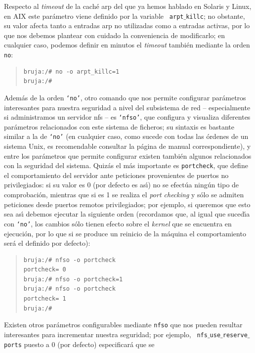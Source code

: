 Respecto al {\it timeout} de la cach\'e {\sc arp} del que ya hemos hablado en
Solaris y Linux, en AIX este par\'ametro viene definido por la variable {\tt
arpt$\_$killc}; no obstante, su valor afecta tanto a entradas {\sc arp} no
utilizadas como a entradas activas, por lo que nos debemos plantear con cuidado
la conveniencia de modificarlo; en cualquier caso, podemos definir en minutos
el {\it timeout} tambi\'en mediante la orden {\tt no}:
\begin{quote}
\begin{verbatim}
bruja:/# no -o arpt_killc=1
bruja:/#
\end{verbatim}
\end{quote}
Adem\'as de la orden {\tt `no'}, otro comando que nos permite configurar 
par\'ametros interesantes para nuestra seguridad a nivel del subsistema de red
-- especialmente si administramos un servidor {\sc nfs} -- es {\tt `nfso'}, que
configura y visualiza diferentes par\'ametros relacionados con este sistema de
ficheros; su sintaxis es bastante similar a la de {\tt `no'} (en cualquier caso,
como sucede con todas las \'ordenes de un sistema Unix, es recomendable 
consultar la p\'agina de manual correspondiente), y entre los par\'ametros que
permite configurar existen tambi\'en algunos relacionados con la seguridad del
sistema. Quiz\'as el m\'as importante es {\tt portcheck}, que define el 
comportamiento del servidor ante peticiones provenientes de puertos no 
privilegiados: si su valor es 0 (por defecto es as\'{\i}) no se efect\'ua
ning\'un tipo de comprobaci\'on, mientras que si es 1 se realiza el {\it port
checking} y s\'olo se admiten peticiones desde puertos remotos privilegiados;
por ejemplo, si queremos que esto sea as\'{\i} debemos ejecutar la siguiente
orden (recordamos que, al igual que suced\'{\i}a con {\tt `no'}, los cambios
s\'olo tienen efecto sobre el {\it kernel} que se encuentra en ejecuci\'on, por
lo que si se produce un reinicio de la m\'aquina el comportamiento ser\'a el
definido por defecto):
\begin{quote}
\begin{verbatim}
bruja:/# nfso -o portcheck
portcheck= 0
bruja:/# nfso -o portcheck=1
bruja:/# nfso -o portcheck
portcheck= 1
bruja:/# 
\end{verbatim}
\end{quote}
Existen otros par\'ametros configurables mediante {\tt nfso} que nos pueden
resultar interesantes para incrementar nuestra seguridad; por ejemplo, {\tt
nfs$\_$use$\_$reserve$\_$ports} puesto a 0 (por defecto) especificar\'a que se 
